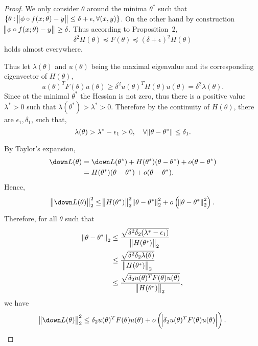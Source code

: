 \documentclass{article}
\begin{document}
\begin{proof}
We only consider $\theta$ around the minima $\theta^*$ such that $\{\theta : \norm{\phi \circ f(x;\theta)-y} \le \delta + \epsilon, \forall (x,y) \}$.
On the other hand by construction $\norm{\phi \circ f(x;\theta)-y} \ge \delta$.
Thus according to Proposition~2,
\begin{equation}
\delta^2 H(\theta) \preceq F(\theta) \preceq (\delta+\epsilon)^2 H(\theta)
\label{eq:h_f}
\end{equation}
holds almost everywhere.

Thus let $\lambda(\theta)$ and $u(\theta)$ being the maximal eigenvalue and its corresponding eigenvector of $H(\theta)$,
\begin{equation}
    u(\theta)^T F(\theta) u(\theta) \ge \delta^2 u(\theta)^T H(\theta) u(\theta) = \delta^2 \lambda(\theta).
\end{equation}
Since at the minimal $\theta^*$ the Hessian is not zero, thus there is a positive value $\lambda^* >0 $ such that $\lambda(\theta^*) > \lambda^* > 0$.
Therefore by the continuity of $H(\theta)$, there are $\epsilon_1, \delta_1$, such that,
\begin{equation}
    \lambda(\theta) > \lambda^* - \epsilon_1 > 0, \quad \forall \norm{\theta-\theta^*} \le \delta_1.
\end{equation}

By Taylor's expansion,
\begin{equation}
\begin{aligned}
    \down L(\theta) &= \down L(\theta^*) + H(\theta^*)(\theta-\theta^*)+o(\theta-\theta^*) \\
    &= H(\theta^*)(\theta-\theta^*)+o(\theta-\theta^*).
\end{aligned}
\end{equation}
Hence,
\begin{equation}
    \norm{\down L(\theta)}_2^2 \le \norm{H(\theta^*)}_2^2 \norm{\theta-\theta^*}_2^2 + o\left(\norm{\theta-\theta^*}_2^2\right).
\end{equation}
Therefore, for all $\theta$ such that
\begin{align}
\norm{\theta-\theta^*}_2 &\le \frac{\sqrt{\delta^2\delta_2 (\lambda^* - \epsilon_1)}}{\norm{H(\theta^*)}_2} \\
&\le \frac{\sqrt{\delta^2\delta_2 \lambda(\theta)}}{\norm{H(\theta^*)}_2} \\
&\le \frac{\sqrt{\delta_2 u(\theta)^T F(\theta) u(\theta)}}{\norm{H(\theta^*)}_2},
\end{align}
we have
\begin{equation}
    \norm{\down L(\theta)}_2^2 \le \delta_2 u(\theta)^T F (\theta) u(\theta) + o\left(\abs{\delta_2 u(\theta)^T F(\theta) u(\theta)}\right).
\end{equation}


\end{proof}
\end{document}
